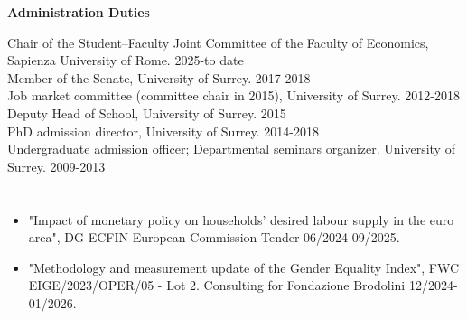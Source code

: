 \documentclass[margin, 11pt]{res} %
\begin{document}
\begin{resume}

\textbf{Administration Duties}

Chair of the Student–Faculty Joint Committee of the Faculty of Economics, Sapienza University of Rome. \hfill 2025-to date\\
Member of the Senate, University of Surrey. \hfill 2017-2018\\
Job market committee (committee chair in 2015), University of Surrey. \hfill 2012-2018\\
Deputy Head of School, University of Surrey. \hfill 2015\\
 PhD admission director, University of Surrey. \hfill 2014-2018\\
Undergraduate admission officer; Departmental seminars organizer. University of Surrey. \hfill 2009-2013

\section{}
\begin{itemize}
\item "Impact of monetary policy on households' desired labour supply in the euro area", DG-ECFIN European Commission Tender \hfill 06/2024-09/2025.
\item "Methodology and measurement update of the Gender Equality Index", FWC EIGE/2023/OPER/05 - Lot 2. Consulting for Fondazione Brodolini \hfill 12/2024-01/2026.
\end{itemize}


\end{resume}
\end{document}
